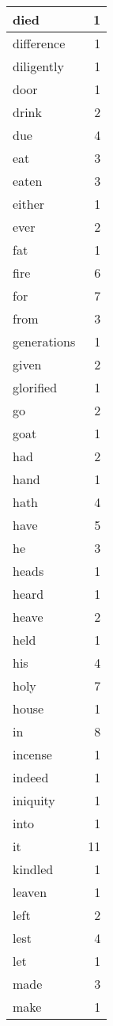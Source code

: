 \begin{center}
\begin{longtable}{l|r}
died & 1 \\ \hline
difference & 1 \\ \hline
diligently & 1 \\ \hline
door & 1 \\ \hline
drink & 2 \\ \hline
due & 4 \\ \hline
eat & 3 \\ \hline
eaten & 3 \\ \hline
either & 1 \\ \hline
ever & 2 \\ \hline
fat & 1 \\ \hline
fire & 6 \\ \hline
for & 7 \\ \hline
from & 3 \\ \hline
generations & 1 \\ \hline
given & 2 \\ \hline
glorified & 1 \\ \hline
go & 2 \\ \hline
goat & 1 \\ \hline
had & 2 \\ \hline
hand & 1 \\ \hline
hath & 4 \\ \hline
have & 5 \\ \hline
he & 3 \\ \hline
heads & 1 \\ \hline
heard & 1 \\ \hline
heave & 2 \\ \hline
held & 1 \\ \hline
his & 4 \\ \hline
holy & 7 \\ \hline
house & 1 \\ \hline
in & 8 \\ \hline
incense & 1 \\ \hline
indeed & 1 \\ \hline
iniquity & 1 \\ \hline
into & 1 \\ \hline
it & 11 \\ \hline
kindled & 1 \\ \hline
leaven & 1 \\ \hline
left & 2 \\ \hline
lest & 4 \\ \hline
let & 1 \\ \hline
made & 3 \\ \hline
make & 1 \\ \hline

\end{longtable}
\end{center}
